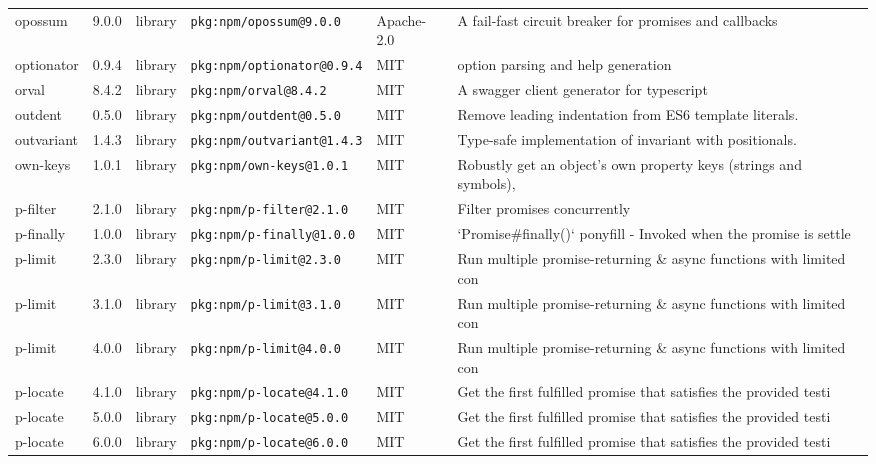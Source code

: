 \documentclass[11pt,a4paper]{article}
\begin{document}
\begin{longtable}{|p{4cm}|p{2cm}|p{1.6cm}|p{5cm}|p{1.5cm}|p{3.5cm}|}
\raggedright opossum & 9.0.0 & library & \small\texttt{pkg:npm/opossum@9.0.0} & Apache-2.0 & \small A fail-fast circuit breaker for promises and callbacks \\
\raggedright optionator & 0.9.4 & library & \small\texttt{pkg:npm/optionator@0.9.4} & MIT & \small option parsing and help generation \\
\raggedright orval & 8.4.2 & library & \small\texttt{pkg:npm/orval@8.4.2} & MIT & \small A swagger client generator for typescript \\
\raggedright outdent & 0.5.0 & library & \small\texttt{pkg:npm/outdent@0.5.0} & MIT & \small Remove leading indentation from ES6 template literals. \\
\raggedright outvariant & 1.4.3 & library & \small\texttt{pkg:npm/outvariant@1.4.3} & MIT & \small Type-safe implementation of invariant with positionals. \\
\raggedright own-keys & 1.0.1 & library & \small\texttt{pkg:npm/own-keys@1.0.1} & MIT & \small Robustly get an object's own property keys (strings and symbols), \\
\raggedright p-filter & 2.1.0 & library & \small\texttt{pkg:npm/p-filter@2.1.0} & MIT & \small Filter promises concurrently \\
\raggedright p-finally & 1.0.0 & library & \small\texttt{pkg:npm/p-finally@1.0.0} & MIT & \small `Promise\#finally()` ponyfill - Invoked when the promise is settle \\
\raggedright p-limit & 2.3.0 & library & \small\texttt{pkg:npm/p-limit@2.3.0} & MIT & \small Run multiple promise-returning \& async functions with limited con \\
\raggedright p-limit & 3.1.0 & library & \small\texttt{pkg:npm/p-limit@3.1.0} & MIT & \small Run multiple promise-returning \& async functions with limited con \\
\raggedright p-limit & 4.0.0 & library & \small\texttt{pkg:npm/p-limit@4.0.0} & MIT & \small Run multiple promise-returning \& async functions with limited con \\
\raggedright p-locate & 4.1.0 & library & \small\texttt{pkg:npm/p-locate@4.1.0} & MIT & \small Get the first fulfilled promise that satisfies the provided testi \\
\raggedright p-locate & 5.0.0 & library & \small\texttt{pkg:npm/p-locate@5.0.0} & MIT & \small Get the first fulfilled promise that satisfies the provided testi \\
\raggedright p-locate & 6.0.0 & library & \small\texttt{pkg:npm/p-locate@6.0.0} & MIT & \small Get the first fulfilled promise that satisfies the provided testi \\

\end{longtable}
\end{document}
